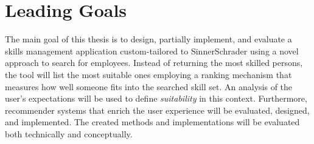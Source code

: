 \newpage

\section{Leading Goals}
The main goal of this thesis is to design, partially implement, and evaluate a skills management application custom-tailored to SinnerSchrader using a novel approach to search for employees. Instead of returning the most skilled persons, the tool will list the most suitable ones employing a ranking mechanism that measures how well someone fits into the searched skill set. An analysis of the user's expectations will be used to define \textit{suitability} in this context.
Furthermore, recommender systems that enrich the user experience will be evaluated, designed, and implemented.
The created methods and implementations will be evaluated both technically and conceptually.
